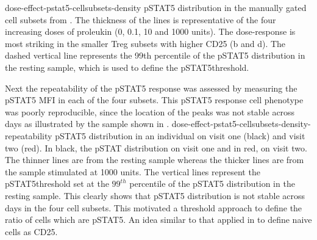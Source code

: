 {dose-effect-pstat5-cellsubsets-density}
{ pSTAT5 distribution in the manually gated cell subsets from . }
{
The thickness of the lines is representative of the four increasing doses of proleukin (0, 0.1, 10 and 1000 units).
The dose-response is most striking in the smaller Treg subsets with higher CD25 (b and d).
The dashed vertical line represents the 99th percentile of the pSTAT5 distribution in the resting sample,
which is used to define the pSTAT5\positive threshold.
}

Next the repeatability of the pSTAT5 response was assessed by measuring the pSTAT5 \gls{MFI} in each of the four subsets.
This pSTAT5 response cell phenotype was poorly reproducible, since the location of the peaks was not stable across days as illustrated by the sample shown in .
{dose-effect-pstat5-cellsubsets-density-repeatability}
{ pSTAT5 distribution in an individual on visit one (black) and visit two (red).
}
{
In black, the pSTAT distribution on visit one and in red, on visit two.
The thinner lines are from the resting sample whereas the thicker lines are from the sample stimulated at 1000 units.
The vertical lines represent the pSTAT5\positive threshold set at the $99^{th}$ percentile of the pSTAT5 distribution in the resting sample.
This clearly shows that pSTAT5 distribution is not stable across days in the four cell subsets.
}
This motivated a threshold approach to define the ratio of cells which are pSTAT5\positive.
An idea similar to that applied in  to define naive cells as CD25\positive.
